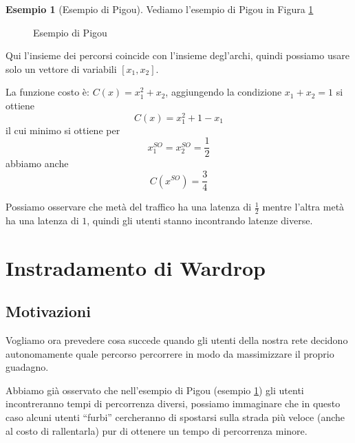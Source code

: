 \documentclass[a4paper]{article}
\newcounter{counter1}
\theoremstyle{plain}
\theoremstyle{definition}
\newtheorem{myes}[counter1]{Esempio}
\theoremstyle{remark}
\newcommand{\pa}[1]{\left(#1\right)}
\newcommand{\bra}[1]{\left[#1\right]}
\begin{document}
\begin{myes}[Esempio di Pigou]
  \label{es:esempio-pigou}
  Vediamo l'esempio di Pigou in Figura \ref{fig:esempio-pigou}
  \begin{figure}[ht]
    \centering
    \caption{Esempio di Pigou}
    \label{fig:esempio-pigou}
  \end{figure}
  Qui l'insieme dei percorsi coincide con l'insieme degl'archi, quindi
  possiamo usare solo un vettore di variabili $\bra{x_1, x_2}$.

  La funzione costo è: $C\pa{x} = x_1^2 + x_2$, aggiungendo la
  condizione $x_1 + x_2 = 1$ si ottiene
  \[ C\pa{x} = x_1 ^2 + 1 - x_1 \]
  il cui minimo si ottiene per
  \[ x^{SO}_1 = x^{SO}_2 = \frac{1}{2} \]
  abbiamo anche
  \[ C\pa{x^{SO}} = \frac{3}{4} \]

  Possiamo osservare che metà del traffico ha una latenza di
  $\frac{1}{2}$ mentre l'altra metà ha una latenza di $1$, quindi gli
  utenti stanno incontrando latenze diverse.
\end{myes}

\section{Instradamento di Wardrop}

\subsection{Motivazioni}
\label{sec:wardrop-motivazioni}

Vogliamo ora prevedere cosa succede quando gli utenti della nostra
rete decidono autonomamente quale percorso percorrere in modo da
massimizzare il proprio guadagno.

Abbiamo già osservato che nell'esempio di Pigou (esempio
\ref{es:esempio-pigou}) gli utenti incontreranno tempi di percorrenza
diversi, possiamo immaginare che in questo caso alcuni utenti
``furbi'' cercheranno di spostarsi sulla strada più veloce (anche al
costo di rallentarla) pur di ottenere un tempo di percorrenza minore.
\end{document}
